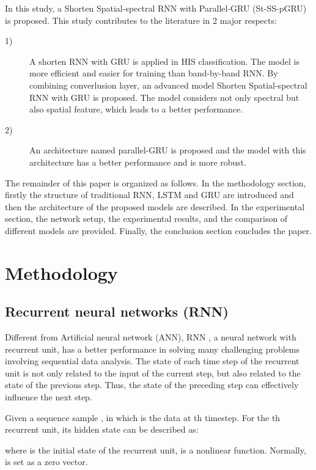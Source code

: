 \documentclass[conference]{IEEEtran}
\begin{document}
In this study, a Shorten Spatial-spectral RNN with Parallel-GRU (St-SS-pGRU) is
proposed. This study contributes to the literature in 2 major respects:

\begin{description}
    \item[1)]
    A shorten RNN with GRU is applied in HIS classification. The model is more
    efficient and easier for training than band-by-band RNN. By combining converlusion
    layer, an advanced model Shorten Spatial-spectral RNN with GRU is proposed.
    The model considers not only spectral but also spatial feature, which leads to a
    better performance.
    \item[2)] 
    An architecture named parallel-GRU is proposed and the model with this architecture
    has a better performance and is more robust.
\end{description}

The remainder of this paper is organized as follows. In the methodology section,
firstly the structure of traditional RNN, LSTM and GRU are introduced and then the
architecture of the proposed models are described. In the experimental section, the
network setup, the experimental results, and the comparison of different models are
provided. Finally, the conclusion section concludes the paper.

\section{Methodology}

\subsection{Recurrent neural networks (RNN)}

Different from Artificial neural network (ANN), RNN \cite{williams1989learning},
a neural network with recurrent unit, has a better performance in solving many
challenging problems involving sequential data analysis. The state of each time
step of the recurrent unit is not only related to the input of the current step,
but also related to the state of the previous step. Thus, the state of the preceding
step can effectively influence the next step.

Given a sequence sample
{},
in which {} is the data at {}th timestep. For the {}th recurrent
unit, its hidden state can be described as:


where {} is the initial state of the recurrent unit, {} is a
nonlinear function. Normally, {} is set as a zero vector.
\end{document}
